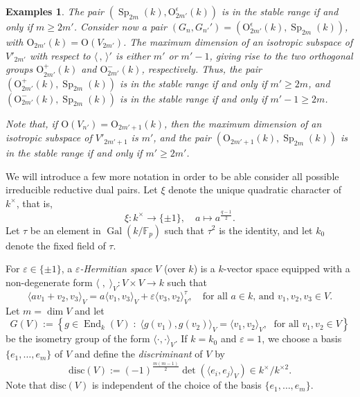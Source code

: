 \documentclass[12pt]{amsart}
\numberwithin{equation}{subsection}
\newtheorem{examples}[equation]{Examples}
\newcommand{\FF}{\mathbb{F}}
\newcommand{\End}{\operatorname{End}}
\newcommand{\disc}{\operatorname{disc}}
\newcommand{\Gal}{\operatorname{Gal}}
\newcommand{\Sp}{\operatorname{Sp}}
\def\disc{{\mathrm{disc}}}
\def\rO{{\mathrm{O}}}
\def\disc{{\mathrm{disc}}}
\begin{document}
\begin{examples} {\rm
The pair $(\Sp_{2m}(k),\rO^\epsilon_{2m'}(k))$ is in the stable range if and only if  $m\ge 2m'$. 
Consider now a pair  $(G_n,G_{n'}')=(\rO^\epsilon_{2m'}(k),\Sp_{2m}(k))$, with $\rO_{2m'}(k)=\rO(V_{2m'})$. The maximum dimension of an isotropic subspace of $V'_{2m'}$ with respect to $\langle\,,\,\rangle'$ is 
either $m'$ or $m'-1$, giving rise to the two orthogonal groups $\rO^+_{2m'}(k)$ and $\rO_{2m'}^-(k)$, respectively. Thus, the pair $(\rO^+_{2m'}(k),\Sp_{2m}(k))$ 
is in the stable range if and only if  $m'\ge 2m$, and $(\rO^-_{2m'}(k),\Sp_{2m}(k))$ is in the stable range if and only if  $m'-1\ge 2m$. 
 
Note that, if $\rO(V_{n'})=\rO_{2m'+1}(k)$, then the maximum dimension of an isotropic subspace of $V'_{2m'+1}$ is $m'$, and the pair $(\rO_{2m'+1}(k),\Sp_{2m}(k))$ is in the stable range 
if and only if  $m'\ge 2m'$.}
\end{examples}

We will introduce a few more notation in order to be able consider all possible irreducible reductive dual pairs. Let $\xi$  denote the unique quadratic character of $k^\times$, that is,
\begin{equation}
\xi\colon k^\times \to \{\pm 1\}, \quad a\mapsto a^{\frac{q-1}{2}}.
\end{equation}
Let $\tau$ be an element in $\Gal(k/\FF_p)$ such that $\tau^2$ is the identity, and let $k_0$ denote the fixed field of $\tau$.

For $\varepsilon\in\{\pm 1\}$, a \textit{$\varepsilon$-Hermitian space} $V$ (over $k$) is a $k$-vector space equipped with a
non-degenerate form $\langle\;,\;\rangle_V\colon V\times V\to k$ such that
\begin{equation}
\langle av_1+v_2,v_3\rangle_V =a\langle v_1,v_3\rangle_V +\varepsilon \langle v_3,v_2\rangle_V^\tau , \quad\text{for all $a\in k$, and $v_1,v_2,v_3 \in V$.}
\end{equation}
Let $m=\dim V$ and let
\begin{equation}
G(V):=\left\{g\in\End_k(V)\;:\;\langle g(v_1),g(v_2)\rangle_V =\langle v_1,v_2\rangle_V ,\;\text{ for all $v_1,v_2 \in V$}\right\}
\end{equation}
be the isometry group of  the form $\langle\cdot,\cdot\rangle_V$. If $k=k_0$ and $\varepsilon = 1$, we choose a basis $\{e_1,\ldots ,e_m\}$ of $V$ and define the \textit{discriminant} of $V$ by
\begin{equation}
\disc(V):=(-1)^{\frac{m(m-1)}{2}}\det\left(\langle e_i,e_j\rangle_V\right)\in k^\times/k^{\times 2}.
\end{equation}
Note that $\disc(V)$ is independent of the choice of the basis $\{e_1,\ldots ,e_m\}$.
\end{document}
